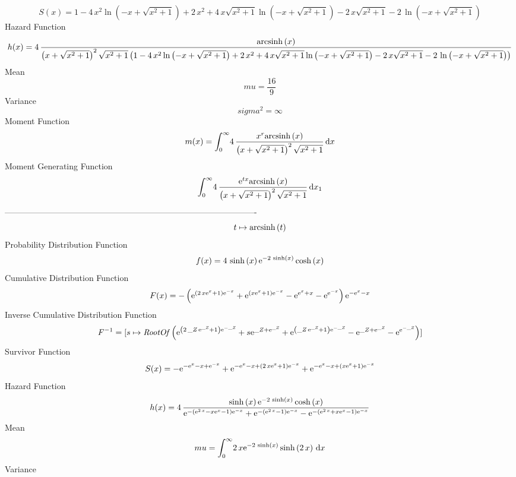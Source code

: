 \documentclass[12pt]{article}
\begin{document}
 $$ S(x)=1-4\,{x}^{2}\ln  \left( -x+\sqrt {{x}^{2}+1} \right) +2\,{x}^{2}+4\,x
\sqrt {{x}^{2}+1}\ln  \left( -x+\sqrt {{x}^{2}+1} \right) -2\,x\sqrt {
{x}^{2}+1}-2\,\ln  \left( -x+\sqrt {{x}^{2}+1} \right) 
$$ Hazard Function 
 $$ h(x)=4\,{\frac {{\rm arcsinh} \left(x\right)}{ \left( x+\sqrt {{x}^{2}+1}
 \right) ^{2}\sqrt {{x}^{2}+1} \left( 1-4\,{x}^{2}\ln  \left( -x+
\sqrt {{x}^{2}+1} \right) +2\,{x}^{2}+4\,x\sqrt {{x}^{2}+1}\ln 
 \left( -x+\sqrt {{x}^{2}+1} \right) -2\,x\sqrt {{x}^{2}+1}-2\,\ln 
 \left( -x+\sqrt {{x}^{2}+1} \right)  \right) }}
$$Mean 
 $$ mu={\frac{16}{9}}
$$ Variance 
 $$ sigma^2 = \infty 
$$Moment Function 
 $$ m(x) = \int_{0}^{\infty }\!4\,{\frac {{x}^{r}{\rm arcsinh} \left(x\right)}{
 \left( x+\sqrt {{x}^{2}+1} \right) ^{2}\sqrt {{x}^{2}+1}}}\,{\rm d}x
$$ Moment Generating Function 
 $$\int_{0}^{\infty }\!4\,{\frac {{{\rm e}^{tx}}{\rm arcsinh} \left(x
\right)}{ \left( x+\sqrt {{x}^{2}+1} \right) ^{2}\sqrt {{x}^{2}+1}}}
\,{\rm d}x_{{1}}
$$-------------------------------------------------------------------------------------------  \\$$t\mapsto {\rm arcsinh} \left(t\right)
$$Probability Distribution Function 
$$  f(x)=4\,\sinh \left( x \right) {{\rm e}^{-2\,\sinh \left( x \right) }}\cosh
 \left( x \right) 
$$Cumulative Distribution Function  
 $$F(x)=- \left( {{\rm e}^{ \left( 2\,x{{\rm e}^{x}}+1 \right) {{\rm e}^{-x}}}
}+{{\rm e}^{ \left( x{{\rm e}^{x}}+1 \right) {{\rm e}^{-x}}}}-{{\rm e}
^{{{\rm e}^{x}}+x}}-{{\rm e}^{{{\rm e}^{-x}}}} \right) {{\rm e}^{-{
{\rm e}^{x}}-x}}
$$ Inverse Cumulative Distribution Function 
  $$F^{-1} = [s\mapsto {\it RootOf} \left( {{\rm e}^{ \left( 2\,{\it \_Z}\,{{\rm e}
^{{\it \_Z}}}+1 \right) {{\rm e}^{-{\it \_Z}}}}}+s{{\rm e}^{{\it \_Z}+
{{\rm e}^{{\it \_Z}}}}}+{{\rm e}^{ \left( {\it \_Z}\,{{\rm e}^{{\it 
\_Z}}}+1 \right) {{\rm e}^{-{\it \_Z}}}}}-{{\rm e}^{{\it \_Z}+{{\rm e}
^{{\it \_Z}}}}}-{{\rm e}^{{{\rm e}^{-{\it \_Z}}}}} \right) ]
$$Survivor Function 
 $$ S(x)=-{{\rm e}^{-{{\rm e}^{x}}-x+{{\rm e}^{-x}}}}+{{\rm e}^{-{{\rm e}^{x}}-
x+ \left( 2\,x{{\rm e}^{x}}+1 \right) {{\rm e}^{-x}}}}+{{\rm e}^{-{
{\rm e}^{x}}-x+ \left( x{{\rm e}^{x}}+1 \right) {{\rm e}^{-x}}}}
$$ Hazard Function 
 $$ h(x)=4\,{\frac {\sinh \left( x \right) {{\rm e}^{-2\,\sinh \left( x
 \right) }}\cosh \left( x \right) }{{{\rm e}^{- \left( {{\rm e}^{2\,x}
}-x{{\rm e}^{x}}-1 \right) {{\rm e}^{-x}}}}+{{\rm e}^{- \left( {
{\rm e}^{2\,x}}-1 \right) {{\rm e}^{-x}}}}-{{\rm e}^{- \left( {{\rm e}
^{2\,x}}+x{{\rm e}^{x}}-1 \right) {{\rm e}^{-x}}}}}}
$$Mean 
 $$ mu=\int_{0}^{\infty }\!2\,x{{\rm e}^{-2\,\sinh \left( x \right) }}\sinh
 \left( 2\,x \right) \,{\rm d}x
$$ Variance 
\end{document}
